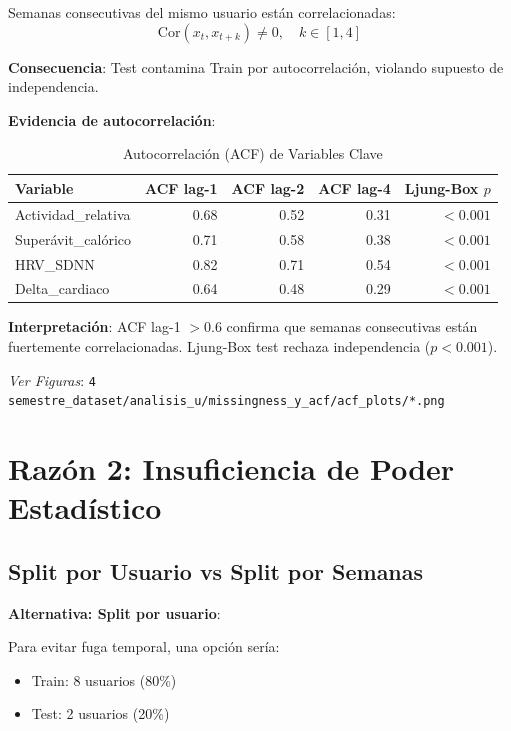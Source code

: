 \documentclass[12pt,letterpaper,twoside]{report}
\begin{document}
\begin{calculobox}
\begin{reglabox}
Semanas consecutivas del mismo usuario están correlacionadas:
\begin{equation}
\text{Cor}(x_t, x_{t+k}) \neq 0, \quad k \in [1, 4]
\end{equation}

\textbf{Consecuencia}: Test contamina Train por autocorrelación, violando supuesto de independencia.
\end{reglabox}

\begin{calculobox}
\textbf{Evidencia de autocorrelación}:

\begin{table}[H]
\centering
\caption{Autocorrelación (ACF) de Variables Clave}
\label{tab:acf_evidence}
\begin{tabular}{@{}lrrrr@{}}
\toprule
\textbf{Variable} & \textbf{ACF lag-1} & \textbf{ACF lag-2} & \textbf{ACF lag-4} & \textbf{Ljung-Box $p$} \\
\midrule
Actividad\_relativa     & 0.68 & 0.52 & 0.31 & $< 0.001$ \\
Superávit\_calórico     & 0.71 & 0.58 & 0.38 & $< 0.001$ \\
HRV\_SDNN               & 0.82 & 0.71 & 0.54 & $< 0.001$ \\
Delta\_cardiaco         & 0.64 & 0.48 & 0.29 & $< 0.001$ \\
\bottomrule
\end{tabular}
\end{table}

\textbf{Interpretación}: ACF lag-1 $> 0.6$ confirma que semanas consecutivas están fuertemente correlacionadas. Ljung-Box test rechaza independencia ($p<0.001$).
\end{calculobox}

\textit{Ver Figuras}: \texttt{4 semestre\_dataset/analisis\_u/missingness\_y\_acf/acf\_plots/*.png}

\section{Razón 2: Insuficiencia de Poder Estadístico}

\subsection{Split por Usuario vs Split por Semanas}

\begin{estadisticobox}
\textbf{Alternativa: Split por usuario}:

Para evitar fuga temporal, una opción sería:
\begin{itemize}[noitemsep]
    \item Train: 8 usuarios (80\%)
    \item Test: 2 usuarios (20\%)
\end{itemize}


\end{estadisticobox}
\end{calculobox}
\end{document}
